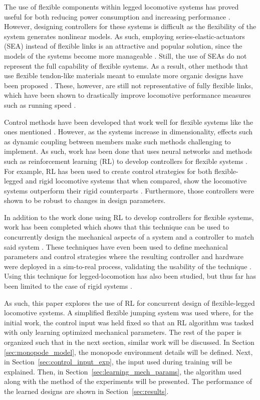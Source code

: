 \documentclass[10pt,twocolumn,letterpaper]{article}
\begin{document}
The use of flexible components within legged locomotive systems has proved useful for both reducing power consumption and increasing performance \cite{Sugiyama2004, Buondonno2017, Hurst2008}. However, designing controllers for these systems is difficult as the flexibility of the system generates nonlinear models. As such, employing series-elastic-actuators (SEA) instead of flexible links is an attractive and popular solution, since the models of the systems become more manageable \cite{Buondonno2017, Zhang2019, Pratt1995}. Still, the use of SEAs do not represent the full capability of flexible systems. As a result, other methods that use flexible tendon-like materials meant to emulate more organic designs have been proposed \cite{Iida2005}. These, however, are still not representative of fully flexible links, which have been shown to drastically improve locomotive performance measures such as running speed \cite{Saranli2001}.

Control methods have been developed that work well for flexible systems like the ones mentioned \cite{Luo1993, Modeling2003}. However, as the systems increase in dimensionality, effects such as dynamic coupling between members make such methods challenging to implement. As such, work has been done that uses neural networks and methods such as reinforcement learning (RL) to develop controllers for flexible systems \cite{Bhagat2019e, Thuruthelb}. For example, RL has been used to create control strategies for both flexible-legged and rigid locomotive systems that when compared, show the locomotive systems outperform their rigid counterparts \cite{Dwiel2019d}. Furthermore, those controllers were shown to be robust to changes in design parameters. 

In addition to the work done using RL to develop controllers for flexible systems, work has been completed which shows that this technique can be used to concurrently design the mechanical aspects of a system and a controller to match said system \cite{Ha2019j}. These techniques have even been used to define mechanical parameters and control strategies where the resulting controller and hardware were deployed in a sim-to-real process, validating the usability of the technique \cite{Chen2020}. Using this technique for legged-locomotion has also been studied, but thus far has been limited to the case of rigid systems \cite{Schaff2019e}. 

As such, this paper explores the use of RL for concurrent design of flexible-legged locomotive systems. A simplified flexible jumping system was used where, for the initial work, the control input was held fixed so that an RL algorithm was tasked with only learning optimized mechanical parameters. The rest of the paper is organized such that in the next section, similar work will be discussed. In Section \ref{sec:monopode_model}, the monopode environment details will be defined. Next, in Section~\ref{sec:control_input_exp}, the input used during training will be explained. Then, in Section~\ref{sec:learning_mech_params}, the algorithm used along with the method of the experiments will be presented. The performance of the learned designs are shown in Section~\ref{sec:results}.
\end{document}
